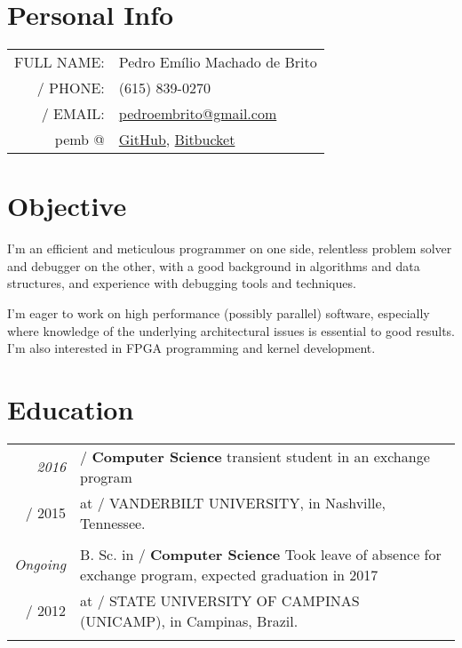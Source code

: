\documentclass[a4paper,10pt]{article}
\makeatletter
\def\fakesc#1{%
  \begingroup%
  \xdef\fake@name{\csname\curr@fontshape/\f@size\endcsname}%
  \fontsize{\fontdimen8\fake@name}{\baselineskip}\selectfont%
  \uppercase{#1}%
  \endgroup%
}
\renewcommand{\textsc}{\fakesc}
\makeatother
\begin{document}
\pagestyle{empty} %

\par{\centering{\Huge Pedro \textsc{Brito}}\bigskip\par}

\section{Personal Info}

 \begin{tabularx}{\textwidth}{ rl}
 \textsc{Full name:} & Pedro Emílio Machado de Brito \\
    \textsc{Phone:} & (615) 839-0270 \\
    \textsc{Email:} & \href{mailto:pedroembrito@gmail.com}{pedroembrito@gmail.com}\\
    \footnotesize{pemb @} & \href{https://github.com/pemb/}{GitHub}, \href{https://bitbucket.org/pemb}{Bitbucket}\\
\end{tabularx}

\section{Objective}

I'm an efficient and meticulous programmer on one side, relentless problem solver and debugger on the other, with a good background in algorithms and data structures, and experience with debugging tools and techniques.

I'm eager to work on high performance (possibly parallel) software, especially where knowledge of the underlying architectural issues is essential to good results. I'm also interested in FPGA programming and kernel development.

\section{Education}

\begin{tabularx}{\textwidth}{r|X}	

  \emph{2016} & \textsc{}\textbf{Computer Science} transient student in an exchange program  \\
  \textsc{2015} & at \textsc{Vanderbilt University,} \footnotesize{in Nashville, Tennessee.}\\
  \multicolumn{2}{c}{}\\

  \emph{Ongoing} & B. Sc. in \textsc{}\textbf{Computer Science} {\tiny Took leave of absence for exchange program, expected graduation in 2017} \\
  \textsc{2012} & at \textsc{State University of Campinas (Unicamp),} \footnotesize{in Campinas, Brazil.}\\
  \multicolumn{2}{c}{}\\

\end{tabularx}
\end{document}
